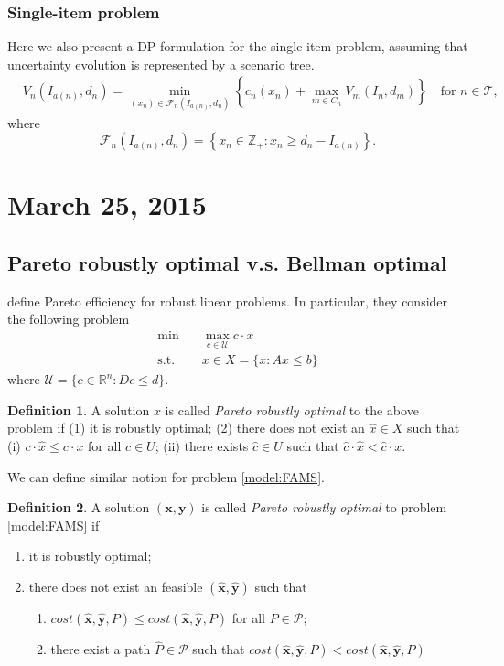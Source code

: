 \documentclass[10pt]{article}
\theoremstyle{plain}
\theoremstyle{definition}
\newtheorem{definition}{Definition}
\theoremstyle{remark}
\newcommand{\subjectto}{\text{s.t.}}
\newcommand{\bx}{\mathbf{x}}
\newcommand{\by}{\mathbf{y}}
\newcommand{\cP}{\mathcal{P}}
\newcommand{\T}{\mathcal{T}}
\newcommand{\Z}{\mathbb{Z}}
\newcommand{\R}{\mathbb{R}}
\begin{document}
\subsubsection*{Single-item problem}
Here we also present a DP formulation for the single-item problem, assuming that uncertainty evolution
is represented by a scenario tree.
\begin{align*}
& V_n(I_{a(n)},d_n) =
\min_{(x_n)\in \mathcal{F}_n(I_{a(n)},d_n)} \left\{c_n(x_n)+
\max_{m\in C_n}V_{m}(I_{n},d_{m})\right\} \quad \text{for } n\in \T,
\end{align*}
where
\[\mathcal{F}_n(I_{a(n)},d_n) = \left\{x_n\in \Z_+:
x_n \ge d_n-I_{a(n)}\right\}.\]

\section*{March 25, 2015}
\subsection*{Pareto robustly optimal v.s. Bellman optimal}
\citet{iancu2013pareto} define Pareto efficiency for robust linear problems.
In particular, they consider the following problem
\begin{align*}
\min \quad & \max_{c\in \mathcal{U}} c\cdot x\\
\subjectto \quad & x\in X = \{x: Ax\le b\}
\end{align*}
where $\mathcal{U} = \{c\in \R^n: Dc\le d\}$.
\begin{definition}
A solution $x$ is called \emph{Pareto robustly optimal} to the above problem if
(1) it is robustly optimal; (2) there does not exist an $\hat{x}\in X$ such that
(i) $c\cdot \hat{x} \le c\cdot x$ for all $c\in U$;
(ii) there exists $\hat{c}\in U$ such that $\hat{c}\cdot \hat{x} < \hat{c}\cdot x$. 
\end{definition}

We can define similar notion for problem \eqref{model:FAMS}.
\begin{definition}
	A solution $(\bx,\by)$ is called \emph{Pareto robustly optimal} to problem \eqref{model:FAMS} if
	\begin{enumerate}[topsep=0pt,noitemsep]
	\item it is robustly optimal;
	\item there does not exist an feasible $(\hat{\bx},\hat{\by})$ such that
	\begin{enumerate}[label=(\roman*)]
		\item $cost(\hat{\bx},\hat{\by},P) \le cost(\hat{\bx},\hat{\by},P)$ for all $P\in \cP$;
		\item there exist a path $\hat{P}\in \cP$ such that
		$cost(\hat{\bx},\hat{\by},P) < cost(\hat{\bx},\hat{\by},P)$
	\end{enumerate}
	\end{enumerate} 
\end{definition}
\end{document}
